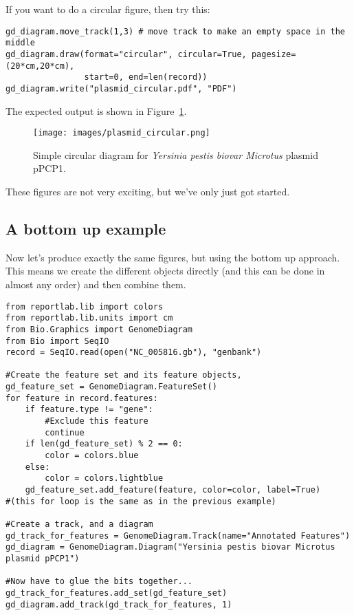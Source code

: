 \documentclass{report}
\begin{document}
If you want to do a circular figure, then try this:

\begin{verbatim}
gd_diagram.move_track(1,3) # move track to make an empty space in the middle
gd_diagram.draw(format="circular", circular=True, pagesize=(20*cm,20*cm),
                start=0, end=len(record))
gd_diagram.write("plasmid_circular.pdf", "PDF")
\end{verbatim}

\begin{htmlonly}

\end{htmlonly}
\begin{latexonly}
The expected output is shown in Figure~\ref{fig:plasmid_circular}.
\begin{figure}[htbp]
\centering
\texttt{[image: images/plasmid\_circular.png]}
\caption{Simple circular diagram for \textit{Yersinia pestis biovar Microtus} plasmid pPCP1.}
\label{fig:plasmid_circular}
\end{figure}
\end{latexonly}
These figures are not very exciting, but we've only just got started.

\subsection{A bottom up example}
Now let's produce exactly the same figures, but using the bottom up approach.
This means we create the different objects directly (and this can be done in
almost any order) and then combine them.

\begin{verbatim}
from reportlab.lib import colors
from reportlab.lib.units import cm
from Bio.Graphics import GenomeDiagram
from Bio import SeqIO
record = SeqIO.read(open("NC_005816.gb"), "genbank")

#Create the feature set and its feature objects,
gd_feature_set = GenomeDiagram.FeatureSet()
for feature in record.features:
    if feature.type != "gene":
        #Exclude this feature
        continue
    if len(gd_feature_set) % 2 == 0:
        color = colors.blue
    else:
        color = colors.lightblue
    gd_feature_set.add_feature(feature, color=color, label=True)
#(this for loop is the same as in the previous example)

#Create a track, and a diagram
gd_track_for_features = GenomeDiagram.Track(name="Annotated Features")
gd_diagram = GenomeDiagram.Diagram("Yersinia pestis biovar Microtus plasmid pPCP1")

#Now have to glue the bits together...
gd_track_for_features.add_set(gd_feature_set)
gd_diagram.add_track(gd_track_for_features, 1)
\end{verbatim}
\end{document}
